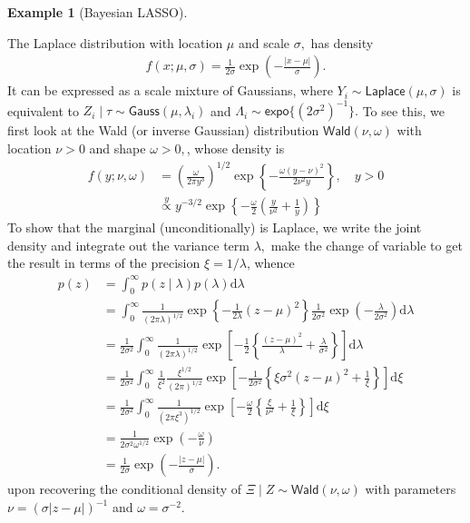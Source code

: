 \documentclass[
  11pt,
  letterpaper,
]{scrbook}
\theoremstyle{definition}
\newtheorem{example}{Example}[chapter]
\theoremstyle{plain}
\theoremstyle{plain}
\theoremstyle{plain}
\theoremstyle{definition}
\theoremstyle{definition}
\theoremstyle{plain}
\theoremstyle{plain}
\theoremstyle{remark}
\begin{document}
\begin{example}[Bayesian
LASSO]\protect\hypertarget{exm-student-mixture-gaussian}{}\label{exm-student-mixture-gaussian}

The Laplace distribution with location \(\mu\) and scale \(\sigma,\) has
density \begin{align*}
f(x; \mu, \sigma) = \frac{1}{2\sigma}\exp\left(-\frac{|x-\mu|}{\sigma}\right).
\end{align*} It can be expressed as a scale mixture of Gaussians, where
\(Y_i \sim \mathsf{Laplace}(\mu, \sigma)\) is equivalent to
\(Z_i \mid \tau \sim \mathsf{Gauss}(\mu, \lambda_i)\) and
\(\Lambda_i \sim \mathsf{expo}\{(2\sigma^2)^{-1}\}.\) To see this, we
first look at the Wald (or inverse Gaussian) distribution
\(\mathsf{Wald}(\nu, \omega)\) with location \(\nu >0\) and shape
\(\omega>0,\), whose density is \begin{align*}
f(y; \nu, \omega) &= \left(\frac{\omega}{2\pi y^{3}}\right)^{1/2} \exp\left\{ - \frac{\omega (y-\nu)^2}{2\nu^2y}\right\}, \quad y > 0
\\ &\stackrel{y}{\propto} y^{-3/2}\exp\left\{-\frac{\omega}{2} \left(\frac{y}{\nu^2} + \frac{1}{y}\right)\right\}
\end{align*} To show that the marginal (unconditionally) is Laplace, we
write the joint density and integrate out the variance term \(\lambda,\)
make the change of variable to get the result in terms of the precision
\(\xi = 1/\lambda\), whence \begin{align*}
p(z) &= \int_{0}^{\infty} p(z \mid \lambda) p(\lambda) \mathrm{d} \lambda 
\\&= \int_0^{\infty} \frac{1}{(2\pi\lambda)^{1/2}}\exp \left\{-\frac{1}{2\lambda}(z-\mu)^2\right\}\frac{1}{2\sigma^2}\exp\left(-\frac{\lambda}{2\sigma^2}\right)  \mathrm{d} \lambda 
\\&= \frac{1}{2\sigma^2}\int_0^{\infty} \frac{1}{(2\pi\lambda)^{1/2}}\exp \left[-\frac{1}{2} \left\{\frac{(z-\mu)^2}{\lambda}+\frac{\lambda}{\sigma^2}\right\}\right] \mathrm{d} \lambda 
\\&= \frac{1}{2\sigma^2}\int_0^{\infty} \frac{1}{\xi^2}\frac{\xi^{1/2}}{(2\pi)^{1/2}}\exp \left[-\frac{1}{2\sigma^2} \left\{\xi\sigma^2(z-\mu)^2+\frac{1}{\xi}\right\}\right] \mathrm{d} \xi
\\&= \frac{1}{2\sigma^2}\int_0^{\infty} \frac{1}{(2\pi\xi^3)^{1/2}}\exp \left[-\frac{\omega}{2} \left\{\frac{\xi}{\nu^2}+\frac{1}{\xi}\right\}\right] \mathrm{d} \xi
\\&= \frac{1}{2\sigma^2\omega^{1/2}}\exp\left(-\frac{\omega}{\nu}\right) 
\\& = \frac{1}{2\sigma}\exp\left(-\frac{|z-\mu|}{\sigma}\right).
\end{align*} upon recovering the conditional density of
\(\Xi \mid Z \sim \mathsf{Wald}(\nu, \omega)\) with parameters
\(\nu=(\sigma|z-\mu|)^{-1}\) and \(\omega=\sigma^{-2}\).


\end{example}
\end{document}
